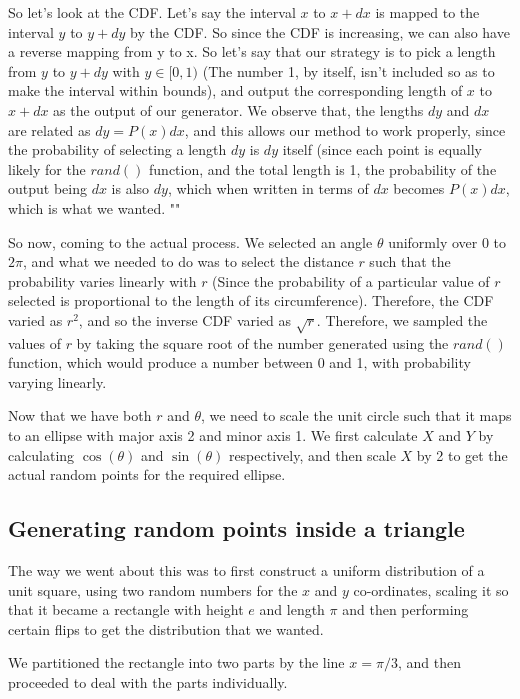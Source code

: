 \documentclass{article}
\begin{document}
So let's look at the CDF. Let's say the interval $x$ to $x + dx$ is mapped to the interval $y$ to $y+dy$ by the CDF. So since the CDF is increasing, we can also have a reverse mapping from y to x. So let's say that our strategy is to pick a length from $y$ to $y + dy$ with $y \in [0,1)$ (The number 1, by itself, isn't included so as to make the interval within bounds), and output the corresponding length of $x$ to $x+dx$ as the output of our generator. We observe that, the lengths $dy$ and $dx$ are related as $dy = P(x)dx$, and this allows our method to work properly, since the probability of selecting a length $dy$ is $dy$ itself (since each point is equally likely for the $rand()$ function, and the total length is 1, the probability of the output being $dx$ is also $dy$, which when written in terms of $dx$ becomes $P(x)dx$, which is what we wanted. ""

So now, coming to the actual process. We selected an angle $\theta$ uniformly over $0$ to $2\pi$, and what we needed to do was to select the distance $r$ such that the probability varies linearly with $r$ (Since the probability of a particular value of $r$ selected is proportional to the length of its circumference). Therefore, the CDF varied as $r^2$, and so the inverse CDF varied as $\sqrt{r}$. Therefore, we sampled the values of $r$ by taking the square root of the number generated using the $rand()$ function, which would produce a number between 0 and 1, with probability varying linearly.

Now that we have both $r$ and $\theta$, we need to scale the unit circle such that it maps to an ellipse with major axis 2 and minor axis 1. We first calculate $X$ and $Y$ by calculating $\cos({\theta})$ and $\sin({\theta})$ respectively, and then scale $X$ by 2 to get the actual random points for the required ellipse.

\subsection{Generating random points inside a triangle}

The way we went about this was to first construct a uniform distribution of a unit square, using two random numbers for the $x$ and $y$ co-ordinates, scaling it so that it became a rectangle with height $e$ and length $\pi$ and then performing certain flips to get the distribution that we wanted.

We partitioned the rectangle into two parts by the line $x = \pi / 3$, and then proceeded to deal with the parts individually.
\end{document}
